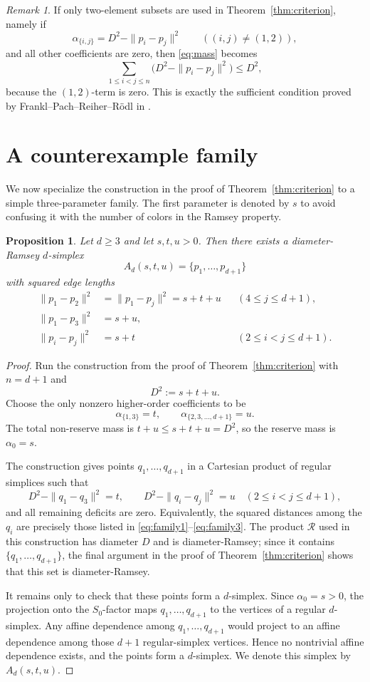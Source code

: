 \documentclass[preprint,12pt]{elsarticle}
\newtheorem{proposition}[theorem]{Proposition}
\theoremstyle{remark}
\newtheorem{remark}[theorem]{Remark}
\begin{document}
\begin{remark}\label{rem:pairwise}
If only two-element subsets are used in Theorem~\ref{thm:criterion}, namely if
\[
\alpha_{\{i,j\}}=D^2-\|p_i-p_j\|^2
\qquad ((i,j)\ne(1,2)),
\]
and all other coefficients are zero, then \eqref{eq:mass} becomes
\[
\sum_{1\le i<j\le n}\bigl(D^2-\|p_i-p_j\|^2\bigr)\le D^2,
\]
because the $(1,2)$-term is zero. This is exactly the sufficient condition proved by Frankl--Pach--Reiher--R\"odl in \cite[Section~4]{FPRR}.
\end{remark}

\section{A counterexample family}
We now specialize the construction in the proof of Theorem~\ref{thm:criterion} to a simple three-parameter family. The first parameter is denoted by $s$ to avoid confusing it with the number of colors in the Ramsey property.

\begin{proposition}\label{prop:familyDR}
Let $d\ge 3$ and let $s,t,u>0$. Then there exists a diameter-Ramsey $d$-simplex
\[
A_d(s,t,u)=\{p_1,\dots,p_{d+1}\}
\]
with squared edge lengths
\begin{align}
\|p_1-p_2\|^2&=\|p_1-p_j\|^2=s+t+u && (4\le j\le d+1), \label{eq:family1}\\
\|p_1-p_3\|^2&=s+u, \label{eq:family2}\\
\|p_i-p_j\|^2&=s+t && (2\le i<j\le d+1). \label{eq:family3}
\end{align}
\end{proposition}

\begin{proof}
Run the construction from the proof of Theorem~\ref{thm:criterion} with $n=d+1$ and
\[
D^2:=s+t+u.
\]
Choose the only nonzero higher-order coefficients to be
\[
\alpha_{\{1,3\}}=t,
\qquad
\alpha_{\{2,3,\dots,d+1\}}=u.
\]
The total non-reserve mass is $t+u\le s+t+u=D^2$, so the reserve mass is $\alpha_0=s$.

The construction gives points $q_1,\dots,q_{d+1}$ in a Cartesian product of regular simplices such that
\[
D^2-\|q_1-q_3\|^2=t,
\qquad
D^2-\|q_i-q_j\|^2=u
\quad (2\le i<j\le d+1),
\]
and all remaining deficits are zero. Equivalently, the squared distances among the $q_i$ are precisely those listed in \eqref{eq:family1}--\eqref{eq:family3}. The product $\mathcal R$ used in this construction has diameter $D$ and is diameter-Ramsey; since it contains $\{q_1,\dots,q_{d+1}\}$, the final argument in the proof of Theorem~\ref{thm:criterion} shows that this set is diameter-Ramsey.

It remains only to check that these points form a $d$-simplex. Since $\alpha_0=s>0$, the projection onto the $S_0$-factor maps $q_1,\dots,q_{d+1}$ to the vertices of a regular $d$-simplex. Any affine dependence among $q_1,\dots,q_{d+1}$ would project to an affine dependence among those $d+1$ regular-simplex vertices. Hence no nontrivial affine dependence exists, and the points form a $d$-simplex. We denote this simplex by $A_d(s,t,u)$.
\end{proof}
\end{document}
